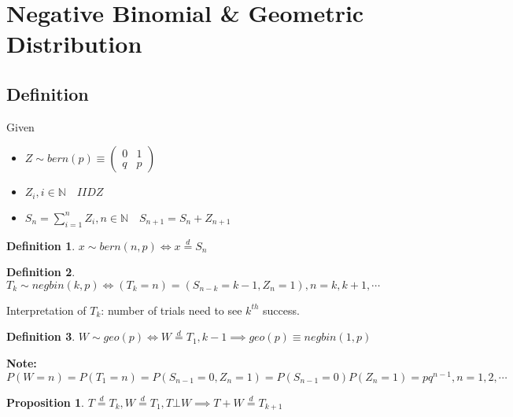 \documentclass{article}
\theoremstyle{definition}
\newtheorem{definition}{Definition}[section]
\theoremstyle{thrm}
\theoremstyle{lma}
\theoremstyle{ppst}
\newtheorem{ppst}{Proposition}[section]
\theoremstyle{crlr}
\begin{document}
\section{Negative Binomial \& Geometric Distribution}
\subsection{Definition}
Given
\begin{itemize}
	\item $Z\sim bern(p) \equiv \begin{pmatrix}
		0 & 1\\
		q & p
	\end{pmatrix}$
	\item $Z_i, i\in \mathbb{N}\quad IID Z $
	\item $S_n = \sum_{i=1}^nZ_i, n\in\mathbb{N}\quad S_{n+1} = S_n+Z_{n+1}$
\end{itemize}
\begin{definition}
	$x\sim bern(n,p) \iff x\stackrel{d}{=}S_n$
\end{definition}
\begin{definition}
	$T_k\sim negbin(k,p) \iff (T_k = n) = (S_{n-k} = k-1, Z_n=1), n= k, k+1,\cdots$
\end{definition}
Interpretation of $T_k$: number of trials need to see $k^{th}$ success. 
\begin{definition}
	$W\sim geo(p) \iff W\stackrel{d}{=}T_1, k-1\implies geo(p)\equiv negbin(1,p)$
\end{definition}
\textbf{Note:} $P(W=n)= P(T_1=n) = P(S_{n-1}=0,Z_n=1) = P(S_{n-1}=0)P(Z_n=1) = pq^{n-1}, n=1,2,\cdots$
\begin{ppst}
	$T\stackrel{d}{=}T_k, W \stackrel{d}{=}T_1, T\bot W \implies T+W\stackrel{d}{=}T_{k+1}$
\end{ppst}
\end{document}
